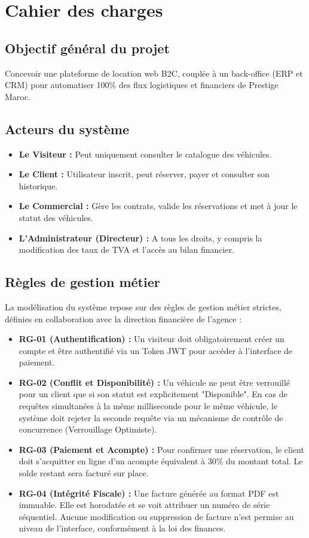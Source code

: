 \chapter{Cahier des charges}

\section{Objectif général du projet}
Concevoir une plateforme de location web B2C, couplée à un back-office (ERP et CRM) pour automatiser 100\% des flux logistiques et financiers de Prestige Maroc.

\section{Acteurs du système}
\begin{itemize}
    \item \textbf{Le Visiteur :} Peut uniquement consulter le catalogue des véhicules.
    \item \textbf{Le Client :} Utilisateur inscrit, peut réserver, payer et consulter son historique.
    \item \textbf{Le Commercial :} Gère les contrats, valide les réservations et met à jour le statut des véhicules.
    \item \textbf{L'Administrateur (Directeur) :} A tous les droits, y compris la modification des taux de TVA et l'accès au bilan financier.
\end{itemize}

\section{Règles de gestion métier}
La modélisation du système repose sur des règles de gestion métier strictes, définies en collaboration avec la direction financière de l'agence :
\begin{itemize}
    \item \textbf{RG-01 (Authentification) :} Un visiteur doit obligatoirement créer un compte et être authentifié via un Token JWT pour accéder à l'interface de paiement.
    \item \textbf{RG-02 (Conflit et Disponibilité) :} Un véhicule ne peut être verrouillé pour un client que si son statut est explicitement "Disponible". En cas de requêtes simultanées à la même milliseconde pour le même véhicule, le système doit rejeter la seconde requête via un mécanisme de contrôle de concurrence (Verrouillage Optimiste).
    \item \textbf{RG-03 (Paiement et Acompte) :} Pour confirmer une réservation, le client doit s'acquitter en ligne d'un acompte équivalent à 30\% du montant total. Le solde restant sera facturé sur place.
    \item \textbf{RG-04 (Intégrité Fiscale) :} Une facture générée au format PDF est immuable. Elle est horodatée et se voit attribuer un numéro de série séquentiel. Aucune modification ou suppression de facture n'est permise au niveau de l'interface, conformément à la loi des finances.
\end{itemize}

